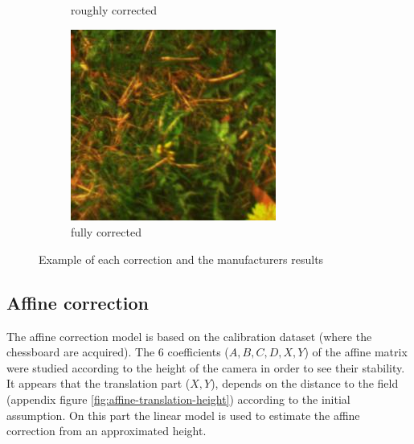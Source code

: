 \documentclass[a4paper,twoside]{article}
\begin{document}
\begin{figure}[ht]
\begin{subfigure}[b]{0.2\textwidth}
			\caption{roughly corrected}
			\label{fig:merged-correction-affine}
		\end{subfigure}
		\begin{subfigure}[b]{0.2\textwidth}
			\centering
			\includegraphics[width=\linewidth]{../figures/results-perspective}
			\caption{fully corrected}
			\label{fig:merged-correction-perspective}
		\end{subfigure}
	
		\caption{Example of each correction and the manufacturers results}
		\label{fig:merged-correction}
	\end{figure}
	
	\subsection{Affine correction}
	
	The affine correction model is based on the calibration dataset (where the chessboard are acquired).
	The 6 coefficients ($A,B,C,D,X,Y$) of the affine matrix were studied according to the height of the camera in order to see their stability.
	It appears that the translation part ($X,Y$), depends on the distance to the field
	(appendix figure \ref{fig:affine-translation-height}) according to the initial assumption.
	On this part the linear model is used to estimate the affine correction from an approximated height.
	
\end{document}
